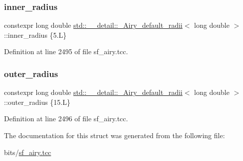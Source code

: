 \subsubsection{\texorpdfstring{inner\+\_\+radius}{inner\_radius}}
{\footnotesize\ttfamily constexpr long double \hyperlink{structstd_1_1____detail_1_1__Airy__default__radii}{std\+::\+\_\+\+\_\+detail\+::\+\_\+\+Airy\+\_\+default\+\_\+radii}$<$ long double $>$\+::inner\+\_\+radius \{5.\+L\}\hspace{0.3cm}{\ttfamily [static]}}



Definition at line 2495 of file sf\+\_\+airy.\+tcc.

\mbox{\label{structstd_1_1____detail_1_1__Airy__default__radii_3_01long_01double_01_4_ab46784c2c76dc0f43aeb85d22f8b21a7}} 
\subsubsection{\texorpdfstring{outer\+\_\+radius}{outer\_radius}}
{\footnotesize\ttfamily constexpr long double \hyperlink{structstd_1_1____detail_1_1__Airy__default__radii}{std\+::\+\_\+\+\_\+detail\+::\+\_\+\+Airy\+\_\+default\+\_\+radii}$<$ long double $>$\+::outer\+\_\+radius \{15.\+L\}\hspace{0.3cm}{\ttfamily [static]}}



Definition at line 2496 of file sf\+\_\+airy.\+tcc.



The documentation for this struct was generated from the following file\+:\begin{DoxyCompactItemize}
\item 
bits/\hyperlink{sf__airy_8tcc}{sf\+\_\+airy.\+tcc}\end{DoxyCompactItemize}

